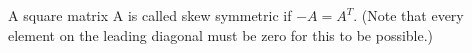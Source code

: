 A square matrix A is called skew symmetric if $-A=A^{T}.$  (Note
that every element on the leading diagonal must be zero for this to be possible.)
